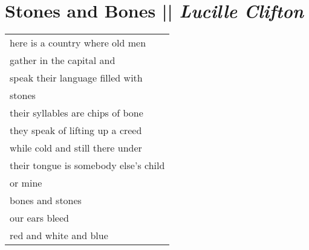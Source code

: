 
\section[Stones and Bones]{Stones and Bones || \emph{Lucille Clifton} \hspace*{\fill}  \thepage}
\label{sec:Stones_and_Bones.tex}
\vspace*{3cm}
\begin{center}
\begin{tabular}{l}
here is a country where old men\\
gather in the capital and\\
speak their language filled with\\
stones\\
their syllables are chips of bone\\
they speak of lifting up a creed\\
while cold and still there under\\
their tongue is somebody else's child\\
or mine\\
bones and stones\\
our ears bleed\\
red and white and blue\\
\end{tabular}
\end{center}